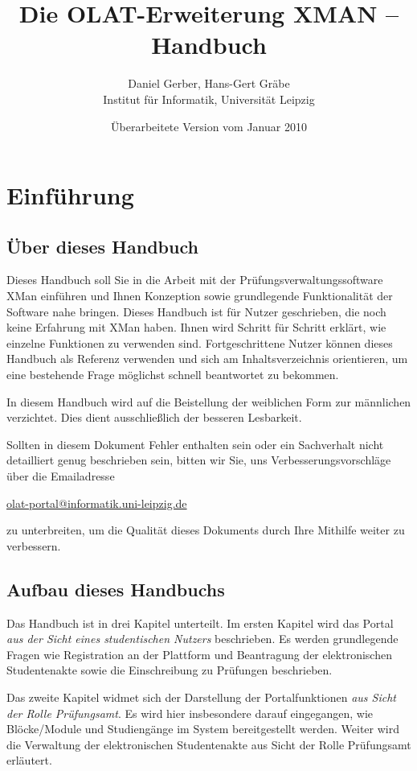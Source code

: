 \documentclass[a4paper,11pt]{article}
\author{Daniel Gerber, Hans-Gert Gräbe\\ 
Institut für Informatik, Universität Leipzig}
\title{Die OLAT-Erweiterung XMAN -- Handbuch}
\date{Überarbeitete Version vom Januar 2010}
\begin{document}
\maketitle

\tableofcontents

\section*{Einführung}

\subsection*{Über dieses Handbuch}

Dieses Handbuch soll Sie in die Arbeit mit der Prüfungsverwaltungssoftware
XMan einführen und Ihnen Konzeption sowie grundlegende Funktionalität der
Software nahe bringen. Dieses Handbuch ist für Nutzer geschrieben, die noch
keine Erfahrung mit XMan haben. Ihnen wird Schritt für Schritt erklärt, wie
einzelne Funktionen zu verwenden sind.  Fortgeschrittene Nutzer können dieses
Handbuch als Referenz verwenden und sich am Inhaltsverzeichnis orientieren, um
eine bestehende Frage möglichst schnell beantwortet zu bekommen.

In diesem Handbuch wird auf die Beistellung der weiblichen Form zur männlichen
verzichtet. Dies dient ausschließlich der besseren Lesbarkeit.

Sollten in diesem Dokument Fehler enthalten sein oder ein Sachverhalt nicht
detailliert genug beschrieben sein, bitten wir Sie, uns
Verbesserungsvorschläge über die Emailadresse
\begin{center}
  \url{olat-portal@informatik.uni-leipzig.de} 
\end{center}
zu unterbreiten, um die Qualität dieses Dokuments durch Ihre Mithilfe weiter
zu verbessern.

\subsection*{Aufbau dieses Handbuchs}

Das Handbuch ist in drei Kapitel unterteilt. Im ersten Kapitel wird das Portal
{\em aus der Sicht eines studentischen Nutzers} beschrieben. Es werden
grundlegende Fragen wie Registration an der Plattform und Beantragung der
elektronischen Studentenakte sowie die Einschreibung zu Prüfungen beschrieben.

Das zweite Kapitel widmet sich der Darstellung der Portalfunktionen {\em aus
  Sicht der Rolle Prüfungsamt}. Es wird hier insbesondere darauf eingegangen,
wie Blöcke/Module und Studiengänge im System bereitgestellt werden.  Weiter
wird die Verwaltung der elektronischen Studentenakte aus Sicht der Rolle
Prüfungsamt erläutert.
\end{document}
